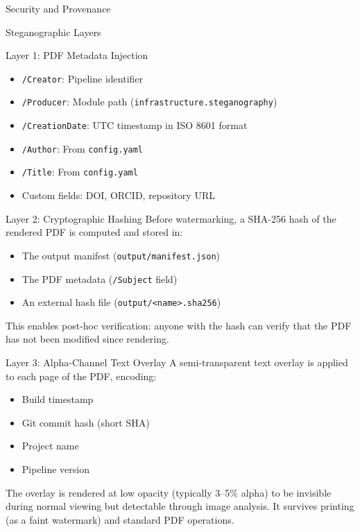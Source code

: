 \documentclass[
  ignorenonframetext,
]{beamer}
\providecommand{\tightlist}{%
  \setlength{\itemsep}{0pt}\setlength{\parskip}{0pt}}
\begin{document}
\begin{frame}[fragile]{Security and Provenance}
\begin{block}{Steganographic Layers}
\begin{block}{Layer 1: PDF Metadata Injection}
\begin{itemize}
\tightlist
\item
  \texttt{/Creator}: Pipeline identifier
\item
  \texttt{/Producer}: Module path
  (\texttt{infrastructure.steganography})
\item
  \texttt{/CreationDate}: UTC timestamp in ISO 8601 format
\item
  \texttt{/Author}: From \texttt{config.yaml}
\item
  \texttt{/Title}: From \texttt{config.yaml}
\item
  Custom fields: DOI, ORCID, repository URL
\end{itemize}
\end{block}

\begin{block}{Layer 2: Cryptographic Hashing}
\protect{}\label{layer-2-cryptographic-hashing}
Before watermarking, a SHA-256 hash of the rendered PDF is computed and
stored in:

\begin{itemize}
\tightlist
\item
  The output manifest (\texttt{output/manifest.json})
\item
  The PDF metadata (\texttt{/Subject} field)
\item
  An external hash file
  (\texttt{output/\textless{}name\textgreater{}.sha256})
\end{itemize}

This enables post-hoc verification: anyone with the hash can verify that
the PDF has not been modified since rendering.
\end{block}

\begin{block}{Layer 3: Alpha-Channel Text Overlay}
\protect{}\label{layer-3-alpha-channel-text-overlay}
A semi-transparent text overlay is applied to each page of the PDF,
encoding:

\begin{itemize}
\tightlist
\item
  Build timestamp
\item
  Git commit hash (short SHA)
\item
  Project name
\item
  Pipeline version
\end{itemize}

The overlay is rendered at low opacity (typically 3--5\% alpha) to be
invisible during normal viewing but detectable through image analysis.
It survives printing (as a faint watermark) and standard PDF operations.


\end{block}
\end{block}
\end{frame}
\end{document}
